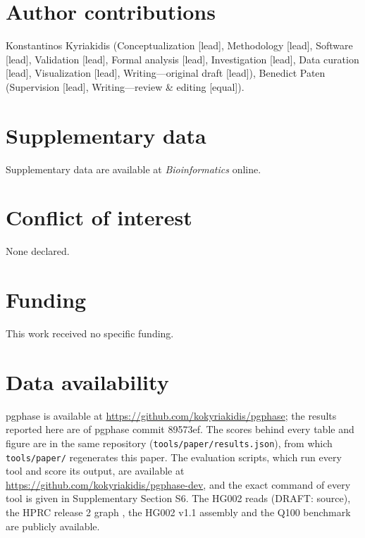 \section*{Author contributions}
Konstantinos Kyriakidis (Conceptualization [lead], Methodology [lead], Software [lead], Validation [lead], Formal analysis [lead], Investigation [lead], Data curation [lead], Visualization [lead], Writing---original draft [lead]), Benedict Paten (Supervision [lead], Writing---review \& editing [equal]).

\section*{Supplementary data}
Supplementary data are available at \emph{Bioinformatics} online.

\section*{Conflict of interest}
None declared.

\section*{Funding}
This work received no specific funding.

\section*{Data availability}
pgphase is available at \url{https://github.com/kokyriakidis/pgphase}; the results reported here are of pgphase commit 89573ef. The scores behind every table and figure are in the same repository (\texttt{tools/paper/results.json}), from which \texttt{tools/paper/} regenerates this paper. The evaluation scripts, which run every tool and score its output, are available at \url{https://github.com/kokyriakidis/pgphase-dev}, and the exact command of every tool is given in Supplementary Section S6. The HG002 reads (DRAFT: source), the HPRC release 2 graph \citep{HPRC2}, the HG002 v1.1 assembly and the Q100 benchmark \citep{Hansen2025} are publicly available.
